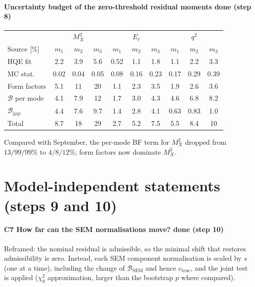 \documentclass[11pt]{article}
\newcommand{\done}{\textcolor{done}{\textbf{done}}}
\begin{document}
\paragraph{Uncertainty budget of the zero-threshold residual moments \hfill \done{} (step 8)}
\begin{center}\small
\begin{tabular}{lccc|ccc|ccc}
\toprule
 & \multicolumn{3}{c}{$M_X^2$} & \multicolumn{3}{c}{$E_\ell$} & \multicolumn{3}{c}{$q^2$} \\
Source [\%] & $m_1$ & $m_2$ & $m_3$ & $m_1$ & $m_2$ & $m_3$ & $m_1$ & $m_2$ & $m_3$ \\
\midrule
HQE fit & 2.2 & 3.9 & 5.6 & 0.52 & 1.1 & 1.8 & 1.1 & 2.2 & 3.3 \\
MC stat. & 0.02 & 0.04 & 0.05 & 0.08 & 0.16 & 0.23 & 0.17 & 0.29 & 0.39 \\
Form factors & 5.1 & 11 & 20 & 1.1 & 2.3 & 3.5 & 1.9 & 2.6 & 3.6 \\
$\mathcal{B}$ per mode & 4.1 & 7.9 & 12 & 1.7 & 3.0 & 4.3 & 4.6 & 6.8 & 8.2 \\
$\mathcal{B}_\mathrm{gap}$ & 4.4 & 7.6 & 9.7 & 1.4 & 2.8 & 4.1 & 0.63 & 0.83 & 1.0 \\
\midrule
Total & 8.7 & 18 & 29 & 2.7 & 5.2 & 7.5 & 5.5 & 8.4 & 10 \\
\bottomrule
\end{tabular}
\end{center}
Compared with September, the per-mode BF term for $M_X^2$ dropped from $13/99/99\%$ to $4/8/12\%$; form factors
now dominate $M_X^2$.

\section{Model-independent statements (steps 9 and 10)}

\paragraph{C7 \quad How far can the SEM normalisations move? \hfill \done{} (step 10)}
Reframed: the nominal residual is admissible, so the minimal shift that restores admissibility is zero. Instead, each SEM
component normalisation is scaled by $s$ (one at a time), including the change of $\mathcal{B}_\text{SEM}$ and hence
$c_\text{true}$, and the joint test is applied ($\chi^2_9$ approximation, larger than the bootstrap $p$ where compared).
\end{document}
